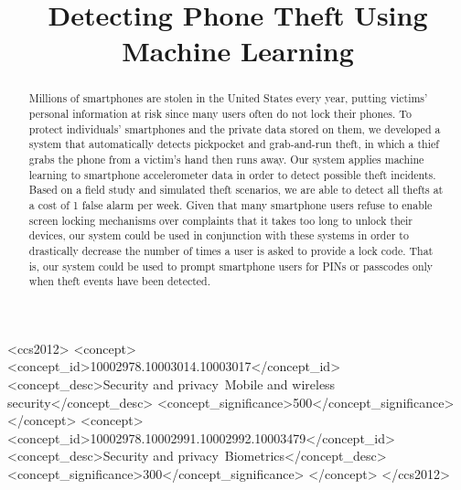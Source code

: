 \documentclass[sigconf, anonymous]{acmart}
\begin{document}
\title{Detecting Phone Theft Using Machine Learning} %

\begin{abstract}
Millions of smartphones are stolen in the United States every year, putting victims' personal information at risk since many users often do not lock their phones. 
To protect individuals' smartphones and the private data stored on them, we developed a system that automatically detects pickpocket and grab-and-run theft, in which a thief grabs the phone from a victim's hand then runs away. 
Our system applies machine learning to smartphone accelerometer data in order to detect possible theft incidents. Based on a field study and simulated theft scenarios, we are able to detect all thefts at a cost of 1 false alarm per week. Given that many smartphone users refuse to enable screen locking mechanisms over complaints that it takes too long to unlock their devices, our system could be used in conjunction with these systems in order to drastically decrease the number of times a user is asked to provide a lock code. That is, our system could be used to prompt smartphone users for PINs or passcodes only when theft events have been detected.
\end{abstract}

\begin{CCSXML}
<ccs2012>
<concept>
<concept_id>10002978.10003014.10003017</concept_id>
<concept_desc>Security and privacy~Mobile and wireless security</concept_desc>
<concept_significance>500</concept_significance>
</concept>
<concept>
<concept_id>10002978.10002991.10002992.10003479</concept_id>
<concept_desc>Security and privacy~Biometrics</concept_desc>
<concept_significance>300</concept_significance>
</concept>
</ccs2012>
\end{CCSXML}



\maketitle




\end{document}

